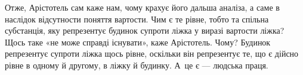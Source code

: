 Отже, Арістотель сам каже нам, чому крахує його дальша аналіза, а саме в наслідок відсутности
поняття вартости. Чим є те рівне, тобто та спільна субстанція, яку репрезентує будинок супроти ліжка
у виразі вартости ліжка? Щось таке «не може справді існувати», каже Арістотель. Чому? Будинок
репрезентує супроти ліжка щось рівне, оскільки він репрезентує те, що є дійсно рівне в одному й
другому, в ліжку й будинку. А~це є — людська праця.
